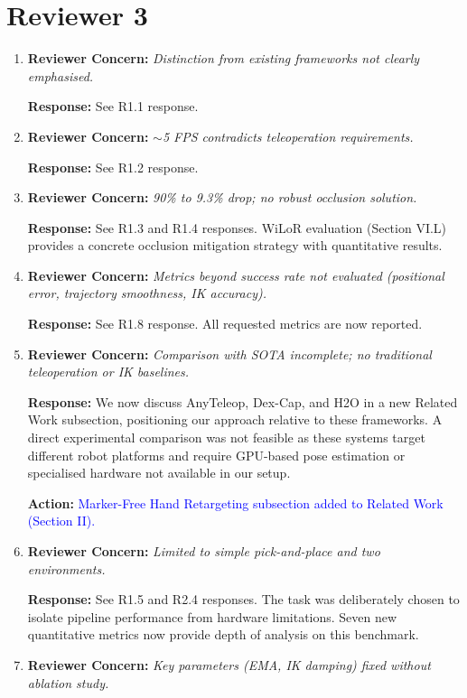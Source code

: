 \documentclass[11pt]{article}
\newcommand{\concern}[1]{\textbf{Reviewer Concern:} \textit{#1}}
\newcommand{\response}[1]{\textbf{Response:} #1}
\newcommand{\action}[1]{\textbf{Action:} \textcolor{blue}{#1}}
\begin{document}
\section*{Reviewer 3}

\begin{enumerate}[label=\textbf{R3.\arabic*}]

\item \concern{Distinction from existing frameworks not clearly emphasised.}

\response{See R1.1 response.}

\item \concern{$\sim$5 FPS contradicts teleoperation requirements.}

\response{See R1.2 response.}

\item \concern{90\% to 9.3\% drop; no robust occlusion solution.}

\response{See R1.3 and R1.4 responses. WiLoR evaluation (Section VI.L) provides a concrete occlusion mitigation strategy with quantitative results.}

\item \concern{Metrics beyond success rate not evaluated (positional error, trajectory smoothness, IK accuracy).}

\response{See R1.8 response. All requested metrics are now reported.}

\item \concern{Comparison with SOTA incomplete; no traditional teleoperation or IK baselines.}

\response{We now discuss AnyTeleop, Dex-Cap, and H2O in a new Related Work subsection, positioning our approach relative to these frameworks. A direct experimental comparison was not feasible as these systems target different robot platforms and require GPU-based pose estimation or specialised hardware not available in our setup.}

\action{Marker-Free Hand Retargeting subsection added to Related Work (Section II).}

\item \concern{Limited to simple pick-and-place and two environments.}

\response{See R1.5 and R2.4 responses. The task was deliberately chosen to isolate pipeline performance from hardware limitations. Seven new quantitative metrics now provide depth of analysis on this benchmark.}

\item \concern{Key parameters (EMA, IK damping) fixed without ablation study.}


\end{enumerate}
\end{document}
